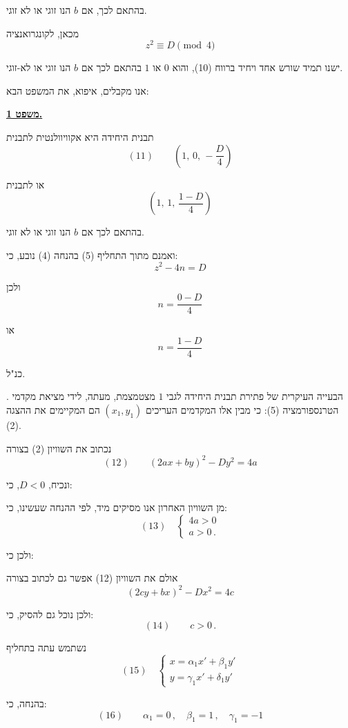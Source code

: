 \noindent בהתאם לכך, אם $b$ הנו זוגי או לא זוגי.

\noindent מכאן, לקונגרואנציה
\[ z^2 \equiv D \pmod{4} \]

\noindent ישנו תמיד שורש אחד ויחיד ברווח (10), והוא $0$ או $1$ בהתאם לכך אם
$b$ הנו זוגי או לא-זוגי.

\noindent אנו מקבלים, איפוא, את המשפט הבא:

\bigskip
\noindent\textbf{\underline{משפט 1.}}

\noindent תבנית היחידה היא אקוויוולנטית לתבנית
\[ (11) \qquad \left(1,\, 0,\, -\dfrac{D}{4}\right) \]

\noindent או לתבנית
\[ \left(1,\, 1,\, \dfrac{1-D}{4}\right) \]

\noindent בהתאם לכך אם $b$ הנו זוגי או לא זוגי.

\noindent ואמנם מתוך התחליף (5) בהנחה (4) נובע, כי:
\[ z^2 - 4n = D \]

\noindent ולכן
\[ n = \frac{0 - D}{4} \]

\noindent או
\[ n = \frac{1 - D}{4} \]

\noindent כנ"ל.

\medskip
{}. הבעייה העיקרית של פתירת תבנית היחידה לגבי $1$ מצטמצמת, מעתה,
לידי מציאת מקדמי הטרנספורמציה (5): כי מבין אלו המקדמים העריכים
$(x_1, y_1)$ הם המקיימים את ההצגה (2).

\noindent נכתוב את השוויון (2) בצורה
\[ (12) \qquad (2ax+by)^2 - Dy^2 = 4a \]

\noindent ונכיח, $D<0$, כי:

\noindent מן השוויון האחרון אנו מסיקים מיד, לפי ההנחה שעשינו, כי:
\[ (13) \quad \left\{ \begin{array}{l}
4a > 0 \\
a > 0 \, .
\end{array} \right. \]

\noindent ולכן כי:

\noindent אולם את השוויון (12) אפשר גם לכתוב בצורה
\[ (2cy+bx)^2 - Dx^2 = 4c \]

\noindent ולכן נוכל גם להסיק, כי:
\[ (14) \qquad c > 0 \, . \]

\noindent נשתמש עתה בתחליף
\[ (15) \quad \left\{ \begin{array}{l}
x = \alpha_1 x' + \beta_1 y' \\
y = \gamma_1 x' + \delta_1 y'
\end{array} \right. \]

\noindent בהנחה, כי:
\[ (16) \qquad \alpha_1 = 0 \, , \quad \beta_1 = 1 \, , \quad \gamma_1 = -1 \]

